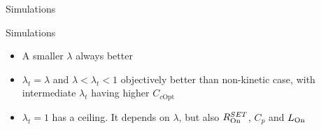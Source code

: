 \documentclass[../main.tex]{subfiles}
\begin{document}
%
%
%   

\begin{frame}{Simulations}
\begin{figure}[t]
\centering
  
\end{figure}
\end{frame}

\begin{frame}{Simulations}
\begin{itemize}
    \item A smaller \(\lambda\)  always better
    \item \(\lambda_{t} = \lambda\) and \(\lambda < \lambda_{t} < 1\) objectively better
        than non-kinetic case, with intermediate \(\lambda_{t}\) having higher \(C_{c\text{Opt}}\)
    \item \(\lambda_{t} = 1\) has a ceiling. It depends on \(\lambda\), but also
        \(R_{\text{On}}^{SET}\), \(C_{p}\) and \(L_{\text{On}}\)
\end{itemize}
\end{frame}
\end{document}
